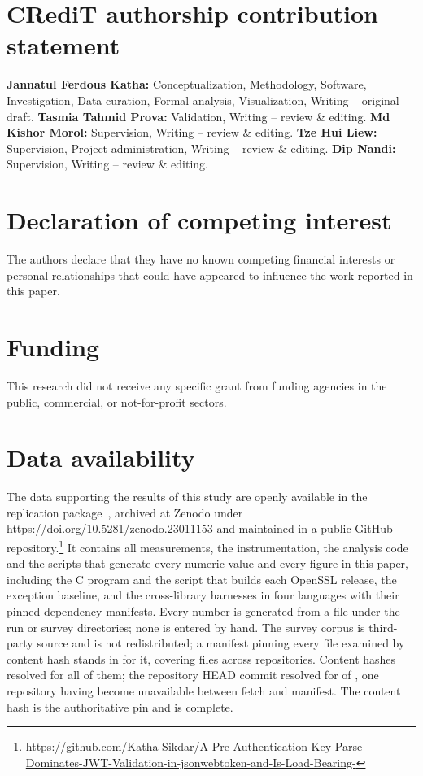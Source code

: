 \documentclass[preprint,12pt,authoryear]{elsarticle}
\begin{document}
\section*{CRediT authorship contribution statement}
\textbf{Jannatul Ferdous Katha:} Conceptualization, Methodology, Software,
Investigation, Data curation, Formal analysis, Visualization, Writing --
original draft.
\textbf{Tasmia Tahmid Prova:} Validation, Writing -- review \& editing.
\textbf{Md Kishor Morol:} Supervision, Writing -- review \& editing.
\textbf{Tze Hui Liew:} Supervision, Project administration, Writing -- review
\& editing.
\textbf{Dip Nandi:} Supervision, Writing -- review \& editing.

\section*{Declaration of competing interest}
The authors declare that they have no known competing financial interests or
personal relationships that could have appeared to influence the work reported
in this paper.

\section*{Funding}
This research did not receive any specific grant from funding agencies in the
public, commercial, or not-for-profit sectors.

\section*{Data availability}
The data supporting the results of this study are openly available in the
replication package~\citep{artifact2026}, archived at Zenodo under
\url{https://doi.org/10.5281/zenodo.23011153} and maintained in a public
GitHub repository.\footnote{\url{https://github.com/Katha-Sikdar/A-Pre-Authentication-Key-Parse-Dominates-JWT-Validation-in-jsonwebtoken-and-Is-Load-Bearing-}}
It contains all measurements, the instrumentation, the analysis code and the
scripts that generate every numeric value and every figure in this paper,
including the C program and the script that builds each OpenSSL release, the
exception baseline, and the cross-library harnesses in four languages with
their pinned dependency manifests. Every number is generated from a file under
the run or survey directories; none is entered by hand. The survey corpus is
third-party source and is not redistributed; a manifest pinning every file
examined by content hash stands in for it, covering \ManifestFiles{} files
across \ManifestRepos{} repositories. Content hashes resolved for all of them;
the repository HEAD commit resolved for \ManifestHeadResolved{} of
\ManifestFiles, one repository having become unavailable between fetch and
manifest. The content hash is the authoritative pin and is complete.
\end{document}

